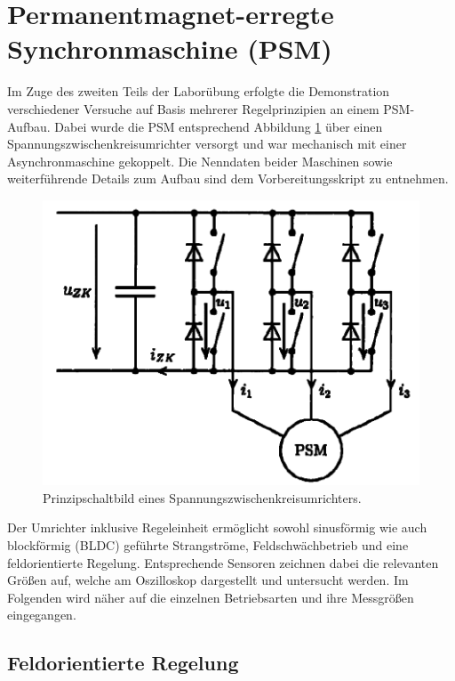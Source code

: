 
\section{Permanentmagnet-erregte Synchronmaschine (PSM)}

Im Zuge des zweiten Teils der Laborübung erfolgte die Demonstration verschiedener Versuche auf Basis mehrerer Regelprinzipien an einem PSM-Aufbau. Dabei wurde die PSM entsprechend Abbildung \ref{fig:umrichter} über einen Spannungszwischenkreisumrichter versorgt und war mechanisch mit einer Asynchronmaschine gekoppelt. Die Nenndaten beider Maschinen sowie weiterführende Details zum Aufbau sind dem Vorbereitungsskript zu entnehmen.

\begin{figure}[h!]
    \centering
    \includegraphics[scale=0.4]{1/Umrichter.png}
    \caption{Prinzipschaltbild eines Spannungszwischenkreisumrichters.}
    \label{fig:umrichter}
\end{figure}

\noindent Der Umrichter inklusive Regeleinheit ermöglicht sowohl sinusförmig wie auch blockförmig (BLDC) geführte Strangströme, Feldschwächbetrieb und eine feldorientierte Regelung. Entsprechende Sensoren zeichnen dabei die relevanten Größen auf, welche am Oszilloskop dargestellt und untersucht werden. Im Folgenden wird näher auf die einzelnen Betriebsarten und ihre Messgrößen eingegangen.

\subsection{Feldorientierte Regelung}

